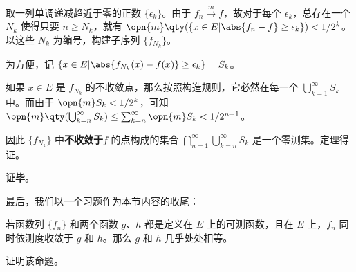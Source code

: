 取一列单调递减趋近于零的正数 $\{\epsilon_k\}$。由于 $f_n\overset{m}\to f$，故对于每个 $\epsilon_k$，总存在一个 $N_k$ 使得只要 $n\geq N_k$，就有 $\opn{m}\qty(\{x\in E|\abs{f_n-f}\geq\epsilon_k\})<1/2^k$。以这些 $N_k$ 为编号，构建子序列 $\{f_{N_k}\}$。

为方便，记 $\{x\in E|\abs{f_{N_k}(x)-f(x)}\geq \epsilon_k\}=S_k$。

如果 $x\in E$ 是 $f_{N_k}$ 的不收敛点，那么按照构造规则，它必然在每一个 $\bigcup^\infty_{k=1}S_k$ 中。而由于 $\opn{m}S_k<1/2^k$，可知 $\opn{m}\qty(\bigcup^\infty_{k=n}S_k)\leq \sum^{\infty}_{k=n}\opn{m}S_k<1/2^{n-1}$。

因此 $\{f_{N_k}\}$ 中\textbf{不收敛于}$f$ 的点构成的集合 $\bigcap^\infty_{n=1}\bigcup^\infty_{k=n}S_k$ 是一个零测集。定理得证。



\textbf{证毕}。


最后，我们以一个习题作为本节内容的收尾：

\begin{exercise}{}

若函数列 $\{f_n\}$ 和两个函数 $g$、$h$ 都是定义在 $E$ 上的可测函数，且在 $E$ 上，$f_n$ 同时依测度收敛于 $g$ 和 $h$。那么 $g$ 和 $h$ 几乎处处相等。

证明该命题。

\end{exercise}








